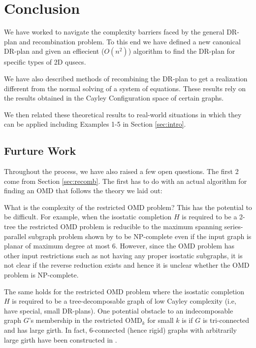 \section{Conclusion}
% 

We have worked to navigate the complexity barriers faced by the general DR-plan and recombination problem. To this end we have defined a new canonical DR-plan and given an effiecient ($O(n^2)$) algorithm to find the DR-plan for specific types of 2D qusecs.

We have also described methods of recombining the DR-plan to get a realization different from the normal solving of a system of equations. These results rely on the results obtained in the Cayley Configuration space of certain graphs.

We then related these theoretical results to real-world situations in which they can be applied including Examples 1-5 in Section \ref{sec:intro}.

\subsection{Furture Work}
Throughout the process, we have also raised a few open questions. The first 2 come from Section \ref{sec:recomb}. The first has to do with an actual algorithm for finding an OMD that follows the theory we laid out:

\begin{openproblem}
What is the complexity of the restricted OMD problem?
This has the potential to be difficult. For example, when the
isostatic completion $H$ is required to be a 2-tree the restricted OMD
problem is reducible to the maximum spanning series-parallel subgraph
problem shown by \cite{cai1993spanning} to be NP-complete even if the input
graph is planar of maximum degree at most 6. However, since the OMD
problem has other input restrictions such as not having any proper
isostatic subgraphs, it is not clear if the reverse reduction exists
and hence it is unclear whether the OMD problem is NP-complete.

The same holds for the restricted OMD problem where the isostatic
completion $H$ is required to be a tree-decomposable graph of low
Cayley complexity (i.e, have special, small DR-plans). One potential
obstacle to an indecomposable graph $G$'s membership in the restricted
OMD$_k$ for small $k$ is if $G$ is tri-connected and has large girth.
In fact, 6-connected (hence rigid) graphs with arbitrarily large girth
have been constructed in \cite{servatius2000rigidity}.
\end{openproblem}

